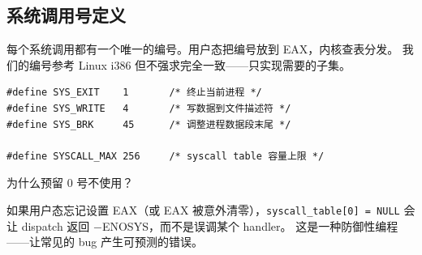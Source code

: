 \subsection{系统调用号定义}
\label{sec:syscall-numbers}

每个系统调用都有一个唯一的编号。用户态把编号放到 EAX，内核查表分发。
我们的编号参考 Linux i386 但不强求完全一致——只实现需要的子集。

\begin{lstlisting}[style=cstyle]
#define SYS_EXIT    1       /* 终止当前进程 */
#define SYS_WRITE   4       /* 写数据到文件描述符 */
#define SYS_BRK     45      /* 调整进程数据段末尾 */

#define SYSCALL_MAX 256     /* syscall table 容量上限 */
\end{lstlisting}

\begin{whybox}
为什么预留 0 号不使用？

如果用户态忘记设置 EAX（或 EAX 被意外清零），\texttt{syscall\_table[0] = NULL}
会让 dispatch 返回 $-$ENOSYS，而不是误调某个 handler。
这是一种防御性编程——让常见的 bug 产生可预测的错误。
\end{whybox}
